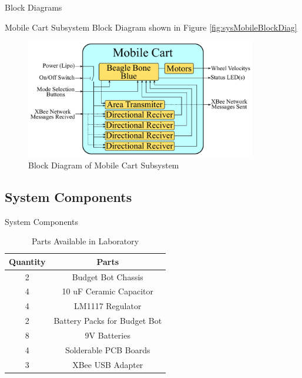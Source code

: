 \documentclass{beamer}
\begin{document}
\begin{frame}{Block Diagrams}
  \begin{block}{}
    Mobile Cart Subsystem Block Diagram shown in Figure \autoref{fig:sysMobileBlockDiag}
  \end{block}
  \begin{figure}[b]
    \centering
    \includegraphics[width=0.9\textwidth]{figs/mobile_cart_block_diagram}
    \caption{Block Diagram of Mobile Cart Subsystem}
    \label{fig:sysMobileBlockDiag}
  \end{figure}
\end{frame}


\subsection{System Components}
\begin{frame}{System Components}
  \begin{table}[h!]
      \centering
      \begin{tabular}{c|c}
          \toprule
          \textbf{Quantity} & \textbf{Parts}\\
          \toprule
          2 & Budget Bot Chassis\\
          4 & 10 uF Ceramic Capacitor\\
          4 & LM1117 Regulator\\
          2 & Battery Packs for Budget Bot\\
          8 & 9V Batteries\\
          4 & Solderable PCB Boards\\
          3 & XBee USB Adapter\\
          \bottomrule
      \end{tabular}
      \caption{Parts Available in Laboratory}
      \label{tab:Partslablist}
  \end{table}
\end{frame}
\end{document}

